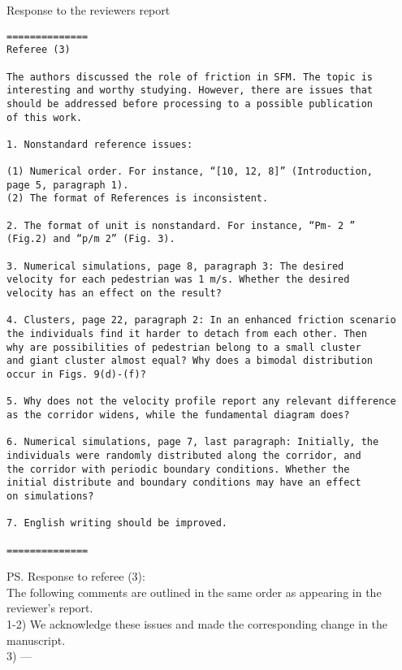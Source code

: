 \documentclass[a4paper,12pt]{letter}
\begin{document}
\begin{letter}{Response to the reviewers report}
{}

\newpage

\begin{verbatim}
==============
Referee (3)

The authors discussed the role of friction in SFM. The topic is 
interesting and worthy studying. However, there are issues that 
should be addressed before processing to a possible publication 
of this work.

1. Nonstandard reference issues:

(1) Numerical order. For instance, “[10, 12, 8]” (Introduction,
page 5, paragraph 1).
(2) The format of References is inconsistent.

2. The format of unit is nonstandard. For instance, “Pm- 2 ” 
(Fig.2) and “p/m 2” (Fig. 3).

3. Numerical simulations, page 8, paragraph 3: The desired 
velocity for each pedestrian was 1 m/s. Whether the desired 
velocity has an effect on the result?

4. Clusters, page 22, paragraph 2: In an enhanced friction scenario 
the individuals find it harder to detach from each other. Then 
why are possibilities of pedestrian belong to a small cluster 
and giant cluster almost equal? Why does a bimodal distribution 
occur in Figs. 9(d)-(f)?

5. Why does not the velocity profile report any relevant difference 
as the corridor widens, while the fundamental diagram does?

6. Numerical simulations, page 7, last paragraph: Initially, the 
individuals were randomly distributed along the corridor, and 
the corridor with periodic boundary conditions. Whether the 
initial distribute and boundary conditions may have an effect 
on simulations?

7. English writing should be improved.

==============

\end{verbatim}


\ps{Response to referee (3): \\

The following comments are outlined in the same order as appearing in the
reviewer’s report. \\

1-2) We acknowledge these issues and made the corresponding change in the 
manuscript.\\

3) ---\\

}
\end{letter}
\end{document}
